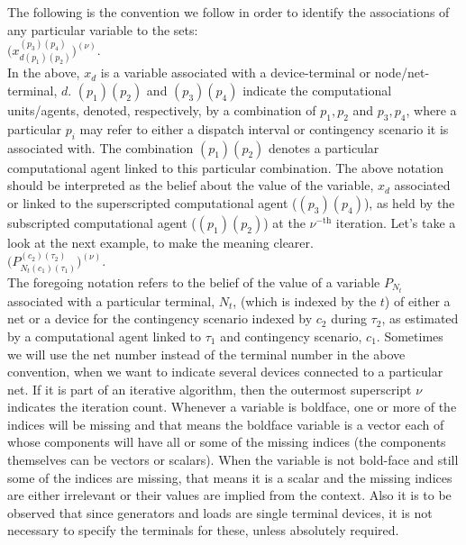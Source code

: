 \documentclass[preprint,12pt,3p]{elsarticle}
\begin{document}
	The following is the convention we follow in order to identify the associations of any particular variable to the sets:\\ $\Big(x_{d(p_1)(p_2)}^{(p_3)(p_4)}\Big)^{(\nu)}$.\\In the above, $x_d$ is a variable associated with a device-terminal or node/net-terminal, $d$. ${(p_1)(p_2)}$ and ${(p_3)(p_4)}$ indicate the computational units/agents, denoted, respectively, by a combination of $p_1, p_2$ and $p_3, p_4$, where a particular $p_i$ may refer to either a dispatch interval or contingency scenario it is associated with. The combination ${(p_1)(p_2)}$ denotes a particular computational agent linked to this particular combination. The above notation should be interpreted as the belief about the value of the variable, $x_d$ associated or linked to the superscripted computational agent (${(p_3)(p_4)}$), as held by the subscripted computational agent (${(p_1)(p_2)}$) at the $\nu^{-\text{th}}$ iteration. Let's take a look at the next example, to make the meaning clearer.\\ $\Big(P_{{N}_{t}(c_1)(\tau_1)}^{(c_2)(\tau_2)}\Big)^{(\nu)}$.\\The foregoing notation refers to the belief of the value of a variable $P_{N_t}$ associated with a particular terminal, $N_t$, (which is indexed by the $t$) of either a net or a device for the contingency scenario indexed by $c_2$ during $\tau_2$, as estimated by a computational agent linked to $\tau_1$ and contingency scenario, $c_1$. Sometimes we will use the net number instead of the terminal number in the above convention, when we want to indicate several devices connected to a particular net. If it is part of an iterative algorithm, then the outermost superscript $\nu$ indicates the iteration count. Whenever a variable is boldface, one or more of the indices will be missing and that means the boldface variable is a vector each of whose components will have all or some of the missing indices (the components themselves can be vectors or scalars). When the variable is not bold-face and still some of the indices are missing, that means it is a scalar and the missing indices are either irrelevant or their values are implied from the context. Also it is to be observed that since generators and loads are single terminal devices, it is not necessary to specify the terminals for these, unless absolutely required.
\end{document}
